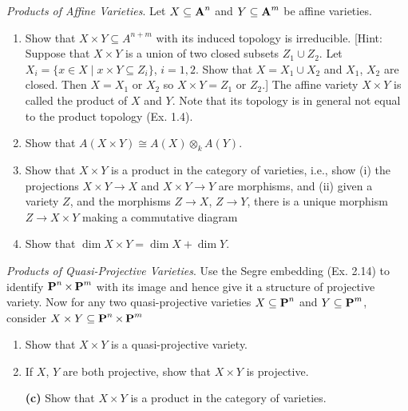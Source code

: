 \documentclass[10pt]{amsart}
\begin{document}
\begin{exercise}[3.15]
    \emph{Products of Affine Varieties}. Let $X \subseteq \aa^n$ and $Y \subseteq \aa^m$ be affine varieties.
    \begin{enumerate}[itemsep=1pt]
        \item Show that $X \times Y \subseteq A^{n+m}$ with its induced topology is irreducible. 
        [Hint: Suppose that $X \times Y$ is a union of two closed subsets $Z_1 \cup Z_2$. Let 
        $X_i = \{x \in X \mid x \times Y \subseteq Z_i\}$, $i = 1,2$. 
        Show that $X = X_1 \cup X_2$ and $X_1$, $X_2$ are closed. Then $X = X_1$ or $X_2$ so $X \times Y = Z_1$ or $Z_2$.] 
        The affine variety $X \times Y$ is called the product of $X$ and $Y$. Note that its topology is in general
        not equal to the product topology (Ex. 1.4).
        \item Show that $A(X \times Y) \cong A(X) \otimes_k A(Y)$.
        \item Show that $X \times Y$ is a product in the category of varieties, i.e., show (i) the
        projections $X \times Y \to X$ and $X \times Y \to Y$ are morphisms, and (ii) given a variety $Z$, 
        and the morphisms $Z \to X$, $Z \to Y$, there is a unique morphism $Z \to X \times Y$ making a commutative 
        diagram 
        \begin{center}
        \end{center}

        \item Show that $\dim X \times Y = \dim X + \dim Y$.
    \end{enumerate}
\end{exercise}


\begin{exercise}[3.16]
    \emph{Products of Quasi-Projective Varieties}. Use the Segre embedding (Ex. 2.14) to identify $\pp^n \times \pp^m$ 
    with its image and hence give it a structure of projective variety. Now for any two quasi-projective varieties 
    $X \subseteq \pp^n$ and $Y \subseteq \pp^m$, consider $X \times Y \subseteq \pp^n \times \pp^m$
    \begin{enumerate}[itemsep=1pt]
        \item Show that $X \times Y$ is a quasi-projective variety.
        \item If $X$, $Y$ are both projective, show that $X \times Y$ is projective.
        \item[{\bf *(c)}] Show that $X \times Y$ is a product in the category of varieties.
    \end{enumerate}
\end{exercise}
\end{document}
